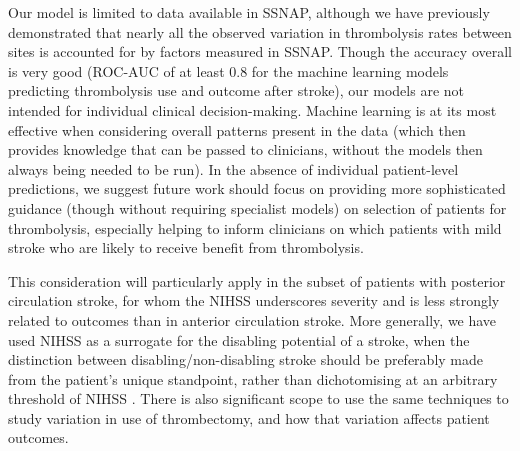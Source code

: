 Our model is limited to data available in SSNAP, although we have previously demonstrated that nearly all the observed variation in thrombolysis rates between sites is accounted for by factors measured in SSNAP. Though the accuracy overall is very good (ROC-AUC of at least 0.8 for the machine learning models predicting thrombolysis use and outcome after stroke), our models are not intended for individual clinical decision-making. Machine learning is at its most effective when considering overall patterns present in the data (which then provides knowledge that can be passed to clinicians, without the models then always being needed to be run). In the absence of individual patient-level predictions, we suggest future work should focus on providing more sophisticated guidance (though without requiring specialist models) on selection of patients for thrombolysis, especially helping to inform clinicians on which patients with mild stroke who are likely to receive benefit from thrombolysis.

This consideration will particularly apply in the subset of patients with posterior circulation stroke, for whom the NIHSS underscores severity and is less strongly related to outcomes than in anterior circulation stroke. More generally, we have used NIHSS as a surrogate for the disabling potential of a stroke, when the distinction between disabling/non-disabling stroke should be preferably made from the patient's unique standpoint, rather than dichotomising at an arbitrary threshold of NIHSS \cite{braksick_thrombolysis_2024}. There is also significant scope to use the same techniques to study variation in use of thrombectomy, and how that variation affects patient outcomes.